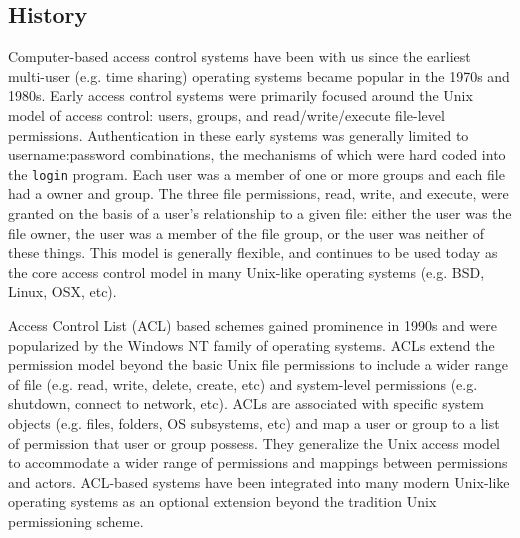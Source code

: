 \documentclass{sig-alternate}
\begin{document}
\subsection{History}

Computer-based access control systems have been with us since the
earliest multi-user (e.g. time sharing) operating systems became
popular in the 1970s and 1980s. Early access control systems were
primarily focused around the Unix model of access control: users,
groups, and read/write/execute file-level permissions. Authentication
in these early systems was generally limited to username:password
combinations, the mechanisms of which were hard coded into the
\texttt{login} program. Each user was a member of one or more groups
and each file had a owner and group. The three file permissions, read,
write, and execute, were granted on the basis of a user's relationship
to a given file: either the user was the file owner, the user was a
member of the file group, or the user was neither of these
things. This model is generally flexible, and continues to be used
today as the core access control model in many Unix-like operating
systems (e.g. BSD, Linux, OSX, etc).

Access Control List (ACL) based schemes gained prominence in 1990s and
were popularized by the Windows NT family of operating systems. ACLs
extend the permission model beyond the basic Unix file permissions to
include a wider range of file (e.g. read, write, delete, create, etc)
and system-level permissions (e.g. shutdown, connect to network,
etc). ACLs are associated with specific system objects (e.g. files,
folders, OS subsystems, etc) and map a user or group to a list of
permission that user or group possess. They generalize the Unix access
model to accommodate a wider range of permissions and mappings between
permissions and actors. ACL-based systems have been integrated into
many modern Unix-like operating systems as an optional extension
beyond the tradition Unix permissioning scheme.
\end{document}
